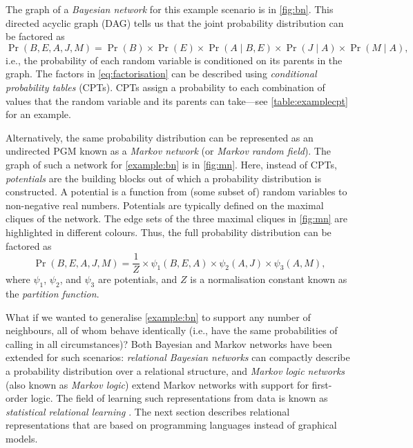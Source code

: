 The graph of a \emph{Bayesian network} for this example scenario is in
\cref{fig:bn}. This directed acyclic graph (DAG) tells us that the joint
probability distribution can be factored as
\begin{equation} \label{eq:factorisation}
  \Pr(B, E, A, J, M) = \Pr(B) \times \Pr(E) \times \Pr(A \mid B, E) \times \Pr(J \mid A) \times \Pr(M \mid A),
\end{equation}
i.e., the probability of each random variable is conditioned on its parents in
the graph. The factors in \cref{eq:factorisation} can be described using
\emph{conditional probability tables} (CPTs). CPTs assign a probability to each
combination of values that the random variable and its parents can take---see
\cref{table:examplecpt} for an example.

Alternatively, the same probability distribution can be represented as an
undirected PGM known as a \emph{Markov network} (or \emph{Markov random field}).
The graph of such a network for \cref{example:bn} is in \cref{fig:mn}. Here,
instead of CPTs, \emph{potentials} are the building blocks out of which a
probability distribution is constructed. A potential is a function from (some
subset of) random variables to non-negative real numbers. Potentials are
typically defined on the maximal cliques of the network. The edge sets of the
three maximal cliques in \cref{fig:mn} are highlighted in different colours.
Thus, the full probability distribution can be factored as
\[
\Pr(B, E, A, J, M) = \frac{1}{Z} \times \psi_1(B, E, A) \times \psi_2(A, J) \times \psi_3(A, M),
\]
where $\psi_1$, $\psi_2$, and $\psi_3$ are potentials, and $Z$ is a
normalisation constant known as the \emph{partition function}.

What if we wanted to generalise \cref{example:bn} to support any number of
neighbours, all of whom behave identically (i.e., have the same probabilities of
calling in all circumstances)? Both Bayesian and Markov networks have been
extended for such scenarios: \emph{relational Bayesian networks}
\citep{DBLP:conf/uai/Jaeger97} can compactly describe a probability distribution
over a relational structure, and \emph{Markov logic networks} (also known as
\emph{Markov logic}) \citep{DBLP:journals/ml/RichardsonD06} extend Markov
networks with support for first-order logic. The field of learning such
representations from data is known as \emph{statistical relational learning}
\citep{DBLP:series/synthesis/2016Raedt}. The next section describes relational
representations that are based on programming languages instead of graphical
models.

